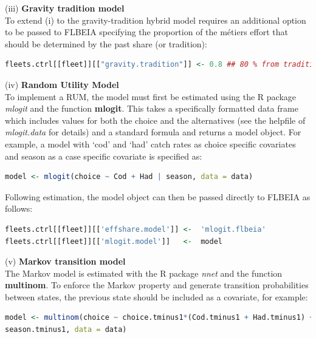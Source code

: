 \documentclass[12pt, halfline, a4paper]{ouparticle}
\begin{document}
(iii) \textbf{Gravity tradition model} \\

To extend (i) to the gravity-tradition hybrid model requires an additional
option to be passed to FLBEIA specifying the proportion of the métiers effort
that should be determined by the past share (or tradition):

\begin{lstlisting}[language=R]
fleets.ctrl[[fleet]][["gravity.tradition"]] <- 0.8 ## 80 % from tradition
\end{lstlisting}

(iv) \textbf{Random Utility Model} \\

To implement a RUM, the model must first be estimated using the R package
\textit{mlogit} \citep{Croissant2019} and the function \textbf{mlogit}. This
takes a specifically formatted data frame which includes values for both the
choice and the alternatives (see the helpfile of \textit{mlogit.data} for
details) and a standard formula and returns a model object. For example, a
model with `cod' and `had' catch rates as choice specific covariates and season
as a case specific covariate is specified as:

\begin{lstlisting}[language=R]
model <- mlogit(choice ~ Cod + Had | season, data = data)
\end{lstlisting}

Following estimation, the model object can then be passed directly to FLBEIA as
follows:

\begin{lstlisting}[language=R]
fleets.ctrl[[fleet]][['effshare.model']] <-  'mlogit.flbeia'
fleets.ctrl[[fleet]][['mlogit.model']]   <-  model 
\end{lstlisting}

(v) \textbf{Markov transition model} \\

The Markov model is estimated with the R package \textit{nnet} and the
function \textbf{multinom}. To enforce the Markov property and
generate transition probabilities between states, the previous state should be
included as a covariate, for example:

\begin{lstlisting}[language=R]
model <- multinom(choice ~ choice.tminus1*(Cod.tminus1 + Had.tminus1) +
season.tminus1, data = data)
\end{lstlisting}
\end{document}
